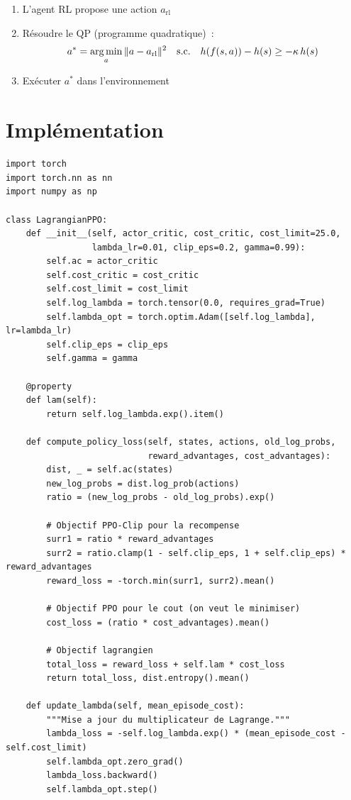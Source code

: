 \begin{algorithme}[title=\textbf{RL avec filtre CBF}]
\begin{enumerate}
    \item L'agent RL propose une action $a_{\text{rl}}$
    \item R\'esoudre le QP (programme quadratique)~:
    \[
        a^* = \operatorname*{arg\,min}_a \|a - a_{\text{rl}}\|^2 \quad \text{s.c.} \quad
        h(f(s, a)) - h(s) \geq -\kappa \, h(s)
    \]
    \item Ex\'ecuter $a^*$ dans l'environnement
\end{enumerate}
\end{algorithme}

\section{Impl\'ementation}

\begin{codeblock}[title=\textbf{PPO-Lagrangien simplifi\'e}]
\begin{verbatim}
import torch
import torch.nn as nn
import numpy as np

class LagrangianPPO:
    def __init__(self, actor_critic, cost_critic, cost_limit=25.0,
                 lambda_lr=0.01, clip_eps=0.2, gamma=0.99):
        self.ac = actor_critic
        self.cost_critic = cost_critic
        self.cost_limit = cost_limit
        self.log_lambda = torch.tensor(0.0, requires_grad=True)
        self.lambda_opt = torch.optim.Adam([self.log_lambda], lr=lambda_lr)
        self.clip_eps = clip_eps
        self.gamma = gamma

    @property
    def lam(self):
        return self.log_lambda.exp().item()

    def compute_policy_loss(self, states, actions, old_log_probs,
                            reward_advantages, cost_advantages):
        dist, _ = self.ac(states)
        new_log_probs = dist.log_prob(actions)
        ratio = (new_log_probs - old_log_probs).exp()

        # Objectif PPO-Clip pour la recompense
        surr1 = ratio * reward_advantages
        surr2 = ratio.clamp(1 - self.clip_eps, 1 + self.clip_eps) * reward_advantages
        reward_loss = -torch.min(surr1, surr2).mean()

        # Objectif PPO pour le cout (on veut le minimiser)
        cost_loss = (ratio * cost_advantages).mean()

        # Objectif lagrangien
        total_loss = reward_loss + self.lam * cost_loss
        return total_loss, dist.entropy().mean()

    def update_lambda(self, mean_episode_cost):
        """Mise a jour du multiplicateur de Lagrange."""
        lambda_loss = -self.log_lambda.exp() * (mean_episode_cost - self.cost_limit)
        self.lambda_opt.zero_grad()
        lambda_loss.backward()
        self.lambda_opt.step()
\end{verbatim}
\end{codeblock}

